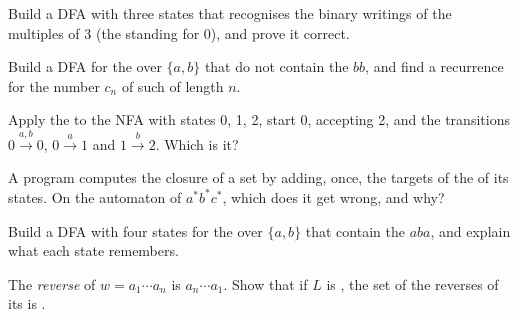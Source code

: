 \begin{exercise}[$\star$]\label{exo:b2:finite-automata:3}
Build a DFA with three states that recognises the binary writings of the multiples of 3 (the  standing for
0), and prove it correct.
\end{exercise}

\begin{exercise}[$\star$]\label{exo:b2:finite-automata:4}
Build a  DFA for the  over $\{a, b\}$ that do not contain the  $bb$, and find a recurrence for the
number $c_n$ of such  of length $n$.
\end{exercise}

\begin{exercise}[$\star\star$]\label{exo:b2:finite-automata:5}
Apply the  to the NFA with states 0, 1, 2, start 0, accepting 2, and the transitions $0
\xrightarrow{a, b} 0$, $0 \xrightarrow{a} 1$ and $1 \xrightarrow{b} 2$. Which  is it?
\end{exercise}

\begin{exercise}[$\star\star$]\label{exo:b2:finite-automata:6}
A program computes the closure of a set by adding, once, the targets of the  of its states. On
the automaton of $a^*b^*c^*$, which  does it get wrong, and why?
\end{exercise}

\begin{exercise}[$\star\star$]\label{exo:b2:finite-automata:7}
Build a DFA with four states for the  over $\{a, b\}$ that contain the  $aba$, and explain what each state
remembers.
\end{exercise}

\begin{exercise}[$\star\star$]\label{exo:b2:finite-automata:8}
The \emph{reverse} of $w = a_1 \cdots a_n$ is $a_n \cdots a_1$. Show that if $L$ is , the set of the
reverses of its  is .
\end{exercise}


